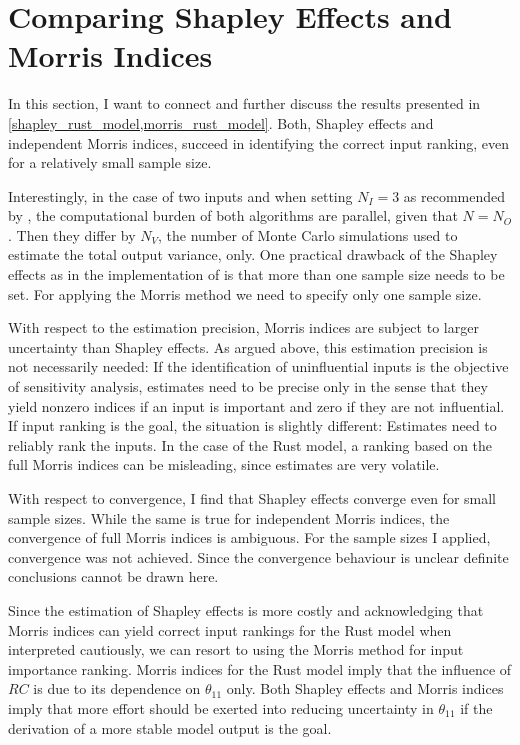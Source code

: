 \section{Comparing Shapley Effects and Morris Indices} \label{comparison}

In this section, I want to connect and further discuss the results presented in \cref{shapley_rust_model,morris_rust_model}. Both, Shapley effects and independent Morris indices, succeed in identifying the correct input ranking, even for a relatively small sample size.

Interestingly, in the case of two inputs and when setting $N_I = 3$ as recommended
by \citet{SNS16}, the computational burden of both algorithms are parallel, given that $N = N_O$. Then they differ by $N_V$, the number of Monte Carlo simulations used to estimate the total output variance, only. One practical drawback
of the Shapley effects as in the implementation of \citet{SNS16} is that more than one sample size needs to be set. For applying the Morris method we need to specify only one sample size.

With respect to the estimation precision, Morris indices are subject to larger uncertainty
than Shapley effects. As argued above, this estimation precision is not necessarily needed: If
the identification of uninfluential inputs is the objective of sensitivity analysis, estimates need to be precise
only in the sense that they yield nonzero indices if an input is important and zero if they
are not influential. If input ranking is the goal, the situation is slightly different: Estimates need to reliably rank the inputs.
In the case of the Rust model, a ranking based on the full Morris indices can be misleading, since estimates are very volatile.

With respect to convergence, I find that Shapley effects converge even for small sample sizes. While the same is true for independent Morris indices, the convergence of full Morris indices is ambiguous. For the sample sizes I applied, convergence was not achieved. Since the convergence behaviour is unclear definite conclusions cannot be drawn here.

Since the estimation of Shapley effects is more costly and acknowledging that Morris
indices can yield correct input rankings for the Rust model when interpreted cautiously, we can resort to using the Morris
method for input importance ranking. Morris indices for the Rust model imply that the influence of $RC$ is due to its dependence on $\theta_{11}$ only. Both Shapley effects and Morris indices imply that more effort should be exerted into reducing uncertainty in $\theta_{11}$ if the derivation of a more stable model output is the goal.

